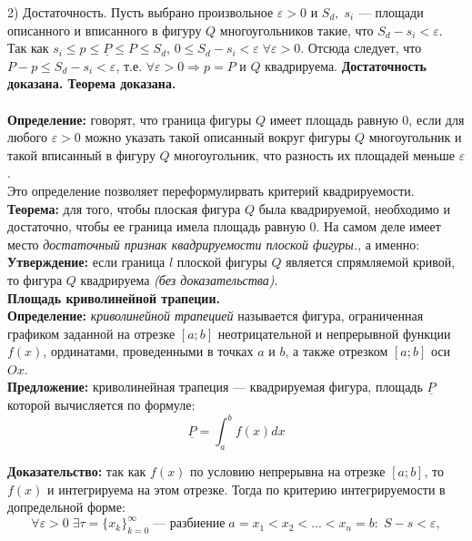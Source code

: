 \documentclass{article}
\begin{document}
  2) Достаточность. Пусть выбрано произвольное $\varepsilon>0$ и $S_d,\;s_i$ --- площади описанного и вписанного в фигуру $Q$ многоугольников такие, что $S_d-s_i<\varepsilon$. Так как $s_i\leq p \leq \underline P \leq P\leq S_d$, $0\leq S_d-s_i<\varepsilon\;\forall\varepsilon>0$. Отсюда следует, что $P-p\leq S_d-s_i<\varepsilon $, т.е. $\forall\varepsilon>0\Rightarrow p=P$ и $Q$ квадрируема. \textbf{Достаточность доказана. Теорема доказана.}\\\\
  
  \textbf{Определение:} говорят, что граница фигуры $Q$ имеет площадь равную $0$, если для любого $\varepsilon>0$ можно указать такой описанный вокруг фигуры $Q$ многоугольник и такой вписанный в фигуру $Q$ многоугольник, что разность их площадей меньше $\varepsilon$.\\
  
  Это определение позволяет переформулирвать критерий квадрируемости.\\
  
  \textbf{Теорема:} для того, чтобы плоская фигура $Q$ была квадрируемой, необходимо и достаточно, чтобы ее граница имела площадь равную $0$. На самом деле имеет место \textit{достаточный признак квадрируемости плоской фигуры.}, а именно:\\
  
  \textbf{Утверждение:} если граница $l$ плоской фигуры $Q$ является спрямляемой кривой, то фигура $Q$ квадрируема \textit{(без доказательства)}.\\
  
  \large\textbf{Площадь криволинейной трапеции.}\normalsize\\
  
  \textbf{Определение:} \textit{криволинейной трапецией} называется фигура, ограниченная графиком заданной на отрезке $[a;b]$ неотрицательной и непрерывной функции $f(x)$, ординатами, проведенными в точках $a$ и $b$, а также отрезком $[a;b]$ оси $Ox$.\\
  
  \textbf{Предложение:} криволинейная трапеция --- квадрируемая фигура, площадь $\underline P$ которой вычисляется по формуле:
  \begin{equation}
    \underline P = \int_a^b f(x)dx
  \end{equation}
  
  \textbf{Доказательство:} так как $f(x)$ по условию непрерывна на отрезке $[a;b]$, то $f(x)$ и интегрируема на этом отрезке. Тогда по критерию интегрируемости в допредельной форме:
  \begin{equation}
    \forall\varepsilon>0\;\exists\tau=\{x_k\}_{k=0}^\infty\; \text{--- разбиение}\; a=x_1<x_2<...<x_n=b:\; S-s<\varepsilon,
  \end{equation}
  
\end{document}
